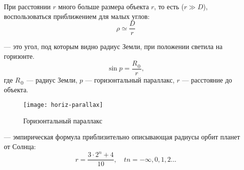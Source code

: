 При расстоянии $r$ много больше размера объекта $r$, то есть ($r\gg D$),
  воспользоваться приближением для малых углов: \begin{equation}
\rho \simeq \frac{D}{r}
\end{equation}

 --- это угол, под которым видно радиус Земли, 
при положении светила на горизонте.
\begin{equation}
\sin p=\frac{R_\oplus}{r},
\end{equation}
где $R_\oplus$ --- радиус Земли, $p$ --- горизонтальный параллакс, $r$ --- 
расстояние до объекта.\\

\begin{figure}[h!]
\centering
\texttt{[image: horiz-parallax]}
\caption{Горизонтальный параллакс}
\end{figure}

 --- эмпирическая формула приблизительно описывающая 
радиусы орбит планет от Солнца:
\begin{equation}r=\frac{3\cdot 2^n+4}{10}, \quad tn=-\infty, 0, 1, 2...
\end{equation}

